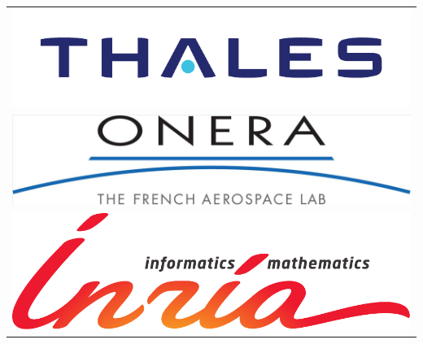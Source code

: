 \documentclass[portrait,a0paper,fontscale=0.277]{baposter}
\begin{document}
\begin{poster}
{\begin{tabular}[]{r}
\includegraphics[scale=0.4]{thales_q}\\
\includegraphics[scale=0.15]{ONERA_logo}\\
\includegraphics[scale=0.2]{logo_inria}
\end{tabular}

}


\newcommand{\colouredcircle}{%
\tikz{\useasboundingbox (-0.2em,-0.32em) rectangle(0.2em,0.32em); \draw[draw=black,fill=lightblue,line width=0.03em] (0,0) circle(0.18em);}}


\end{poster}
\end{document}
